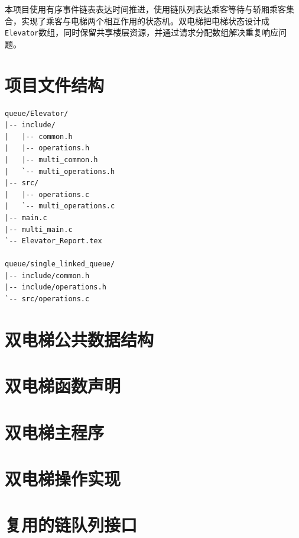 \documentclass[UTF8,a4paper,12pt]{ctexart}
\begin{document}
本项目使用有序事件链表表达时间推进，使用链队列表达乘客等待与轿厢乘客集合，实现了乘客与电梯两个相互作用的状态机。双电梯把电梯状态设计成\texttt{Elevator}数组，同时保留共享楼层资源，并通过请求分配数组解决重复响应问题。


\appendix
\section{项目文件结构}

\begin{lstlisting}[language={},numbers=none]
queue/Elevator/
|-- include/
|   |-- common.h
|   |-- operations.h
|   |-- multi_common.h
|   `-- multi_operations.h
|-- src/
|   |-- operations.c
|   `-- multi_operations.c
|-- main.c
|-- multi_main.c
`-- Elevator_Report.tex

queue/single_linked_queue/
|-- include/common.h
|-- include/operations.h
`-- src/operations.c
\end{lstlisting}

\section{双电梯公共数据结构}


\section{双电梯函数声明}


\section{双电梯主程序}


\section{双电梯操作实现}


\section{复用的链队列接口}

\end{document}
